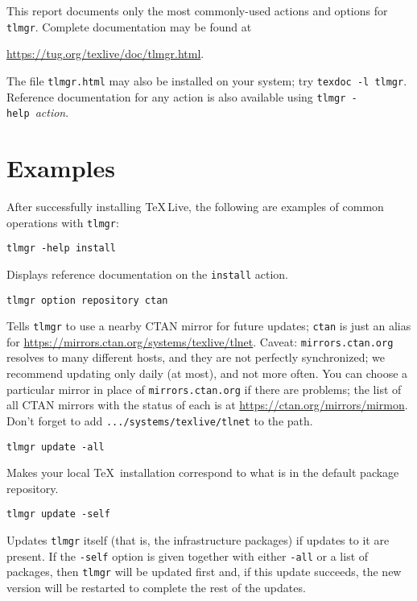 \documentclass[11pt]{article}
\begin{document}
This report documents only the most commonly-used actions
and options for \texttt{tlmgr}. Complete documentation may
be found at
\begin{center}
  \url{https://tug.org/texlive/doc/tlmgr.html}. 
\end{center}
The file \texttt{tlmgr.html} may also be installed on your system; try \texttt{texdoc -l tlmgr}.
Reference documentation for any action is also available using 
\texttt{tlmgr  -help}~\textit{action}.

\section{Examples}

After successfully installing \TeX\,Live, the following are
examples of common operations with \texttt{tlmgr}:
\begin{description}

\item\texttt{tlmgr -help install}\par

Displays reference documentation on the \texttt{install} action.

\item\texttt{tlmgr option repository ctan}\par 

Tells \texttt{tlmgr} to use a nearby CTAN mirror for
future updates; \texttt{ctan} is just an alias for
\url{https://mirrors.ctan.org/systems/texlive/tlnet}. Caveat:
\texttt{mirrors.ctan.org} resolves to many different
hosts, and they are not perfectly synchronized; we
recommend updating only daily (at most), and not more
often. You can choose a particular mirror in place of
\texttt{mirrors.ctan.org} if there are problems; the
list of all CTAN mirrors with the status of each is at
\url{https://ctan.org/mirrors/mirmon}. Don't forget to add
\texttt{.../systems/texlive/tlnet} to the path.

\enlargethispage*{10ex}
\item\texttt{tlmgr update -all}\par 

Makes your local \TeX\ installation correspond to what is in
the default package repository.

\item\texttt{tlmgr update -self}\par 

Updates \texttt{tlmgr} itself (that is, the infrastructure
packages) if updates to it are present. If the
\texttt{-self} option is given together with either
\texttt{-all} or a list of packages, then \texttt{tlmgr}
will be updated first and, if this update succeeds, the
new version will be restarted to complete the rest of the
updates.


\end{description}
\end{document}
